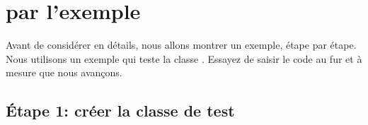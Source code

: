 \documentclass[a4paper,10pt,twoside]{book}
\begin{document}


\section{\sunit par l'exemple}

Avant de considérer \SUnit en détails, nous allons montrer un exemple, étape par étape. Nous utilisons un exemple qui teste la classe . Essayez de saisir le code au fur et à mesure que nous avançons.
\subsection{\'Etape 1: créer la classe de test}

\end{document}
